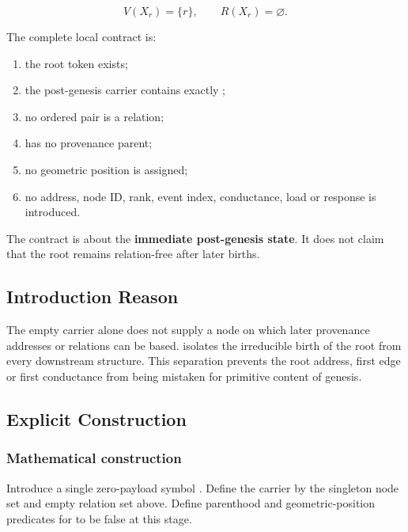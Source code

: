 \[
V(X_r)=\{r\},\qquad R(X_r)=\varnothing.
\]

The complete local contract is:

\begin{enumerate}
\def\labelenumi{\arabic{enumi}.}
\tightlist
\item
  the root token \texttt{\protect{}} exists;
\item
  the post-genesis carrier contains exactly \texttt{\protect{}};
\item
  no ordered pair is a relation;
\item
  \texttt{\protect{}} has no provenance parent;
\item
  no geometric position is assigned;
\item
  no address, node ID, rank, event index, conductance, load or response
  is introduced.
\end{enumerate}

The contract is about the \textbf{immediate post-genesis state}. It does
not claim that the root remains relation-free after later births.

\subsection{Introduction Reason}\label{introduction-reason-3}

The empty carrier alone does not supply a node on which later provenance
addresses or relations can be based. \texttt{\protect{}} isolates the
irreducible birth of the root from every downstream structure. This
separation prevents the root address, first edge or first conductance
from being mistaken for primitive content of genesis.

\subsection{Explicit Construction}\label{explicit-construction}

\subsubsection{Mathematical
construction}\label{mathematical-construction}

Introduce a single zero-payload symbol \texttt{\protect{}}. Define the carrier
\texttt{\protect{}} by the singleton node set and empty relation set above.
Define parenthood and geometric-position predicates for \texttt{\protect{}} to be
false at this stage.

